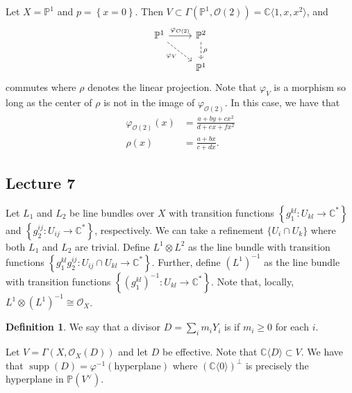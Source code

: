 \documentclass[10pt,letterpaper,cm]{nupset}
\theoremstyle{definition}
\newtheorem{defn}{Definition}[subsection]
\theoremstyle{theorem}
\theoremstyle{remark}
\newcommand{\C}{\mathbb C}
\renewcommand{\O}{\mathcal O}
\renewcommand{\P}{\mathbb P}
\newcommand{\1}{\mathbb{1}}
\newcommand{\0}{\vec 0}
\DeclareMathOperator{\supp}{supp}
\begin{document}
Let $X = \P^1$ and $p = \left\{x=0\right\}$. Then $V \subset \Gamma\left(\P^1, \O(2)\right) = \C\langle 1, x, x^2\rangle$, and
\[
\begin{tikzcd}
\P^1 \arrow[rd, "\varphi_V"', dashed] \arrow[r, "\varphi_{\O(2)}"] & \P^2 \arrow[d, "\rho", dashed] \\
                                                                   & \P^1                       
\end{tikzcd}
\] commutes where $\rho$ denotes the linear projection. Note that $\varphi_V$ is a morphism so long as the center of $\rho$ is not in the image of $\varphi_{\O(2)}$. In this case, we have that
\begin{align*}
\varphi_{\O(2)}(x) & = \frac{a +by + cx^2}{d + ex +fx^2}
\\  \rho(x) & = \frac{a+bx}{c+dx}.
\end{align*}

\subsection{Lecture 7}

Let $L_1$ and $L_2 $ be line bundles over $X$ with transition functions $\left\{g_1^{k{l}} : U_{k{l}} \to \C^{\ast}\right\}$ and $\left\{g_2^{i{j}} : U_{i{j}} \to \C^{\ast}\right\}$, respectively. We can take a refinement $\{U_{i} \cap U_k\}$ where both $L_1$ and $L_2$ are trivial.  Define $L^1 \otimes L^2$ as the line bundle with transition functions $\left\{g_1^{k{l}}g_2^{i{j}} : U_{ij} \cap U_{k{l}} \to \C^{\ast}\right\}$. Further, define $\left(L^1\right)^{-1}$ as the line bundle with transition functions $\left\{\left(g_1^{k{l}}\right)^{-1} : U_{k{l}} \to \C^{\ast}\right\}$. Note that, locally, $L^1 \otimes \left(L^1\right)^{-1} \cong \O_X$.

\begin{defn}
We say that a divisor $D = \sum_im_iY_i$ is  if $m_i\geq 0$ for each $i$.
\end{defn}

Let $V = \Gamma\left(X, \O_X(D)\right)$ and let $D$ be effective. Note that $\C\langle D \rangle \subset V$. We have that $\supp(D) = \varphi^{-1}\left(\text{hyperplane}\right)$ where $\left(\C \langle 0\rangle \right)^{\perp}$ is precisely the hyperplane in $\P\left(V^{\vee}\right)$.
\end{document}
